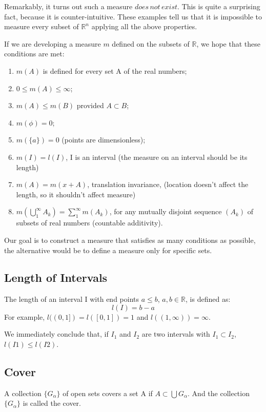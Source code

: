 \documentclass{article}
\begin{document}
 Remarkably, it turns out such a measure $does \, not \,exist$. This is quite a surprising fact, because it is counter-intuitive. These examples tell us that it is impossible to measure every subset of $\mathbb{R}^n$ applying all the above properties.\medskip
 
 If we are developing a measure $m$ defined on the subsets of $\mathbb{R}$, we hope that these conditions are met:
 \begin{enumerate}
     \item $m(A)$ is defined for every set A of the real numbers;
     \item $0\leq m(A) \leq \infty$;
     \item $m(A) \leq m(B)$ provided $A \subset B$;
     \item $m(\phi) =0 $;
     \item $m(\{a\})=0$ (points are dimensionless);
     \item $m(I)=l(I)$, I is an interval (the measure on an interval should be its length)
     \item $m(A)=m(x+A)$, translation invariance, (location doesn't affect the length, so it shouldn't affect measure)
     \item $m(\bigcup_{1}^{\infty} {A_k}) = \sum_{1}^{\infty}m(A_k)$, for any mutually disjoint sequence $(A_k)$ of subsets of real numbers (countable additivity).
 \end{enumerate}
 Our goal is to construct a measure that satisfies as many conditions as possible, the alternative would be to define a measure only for specific sets.
 
 \subsection{Length of Intervals}
 
 The length of an interval I with end points $a\leq b$, $a,b \in \mathbb{R}$, is defined as:
 $$l(I) = b-a$$
 For example, $l((0,1])=l([0,1])=1$ and $l((1,\infty))=\infty$.
 
 We immediately conclude that, if $I_1$ and $I_2$ are two intervals with $I_1 \subset I_2$, $l(I1) \leq l(I2)$.
 
 \subsection{Cover}
 
 A collection $\{G_{\alpha}\}$ of open sets covers a set A if $A \subset \bigcup G_{\alpha}$. And the collection $\{G_{\alpha}\}$ is called the cover.
 
\end{document}
